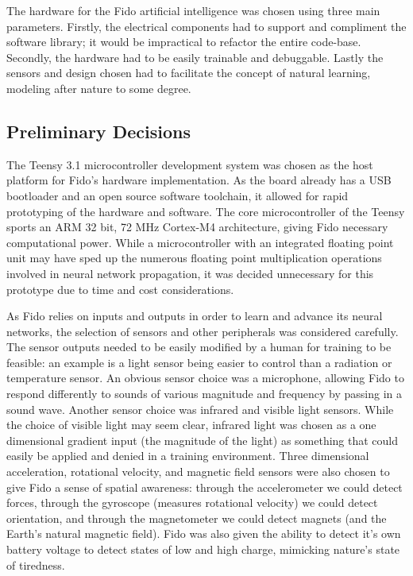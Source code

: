 The hardware for the Fido artificial intelligence was chosen using three main parameters.  Firstly, the electrical components had to support and compliment the software library; it would be impractical to refactor the entire code-base.  Secondly, the hardware had to be easily trainable and debuggable.  Lastly the sensors and design chosen had to facilitate the concept of natural learning, modeling after nature to some degree.

\subsection{Preliminary Decisions}

The Teensy 3.1 microcontroller development system was chosen as the host platform for Fido's hardware implementation.  As the board already has a USB bootloader and an open source software toolchain, it allowed for rapid prototyping of the hardware and software.  The core microcontroller of the Teensy sports an ARM 32 bit, 72 MHz Cortex-M4 architecture, giving Fido necessary computational power.  While a microcontroller with an integrated floating point unit may have sped up the numerous floating point multiplication operations involved in neural network propagation, it was decided unnecessary for this prototype due to time and cost considerations.

As Fido relies on inputs and outputs in order to learn and advance its neural networks, the selection of sensors and other peripherals was considered carefully.  The sensor outputs needed to be easily modified by a human for training to be feasible: an example is a light sensor being easier to control than a radiation or temperature sensor.  An obvious sensor choice was a microphone, allowing Fido to respond differently to sounds of various magnitude and frequency by passing in a sound wave.  Another sensor choice was infrared and visible light sensors.  While the choice of visible light may seem clear, infrared light was chosen as a one dimensional gradient input (the magnitude of the light) as something that could easily be applied and denied in a training environment.  Three dimensional acceleration, rotational velocity, and magnetic field sensors were also chosen to give Fido a sense of spatial awareness: through the accelerometer we could detect forces, through the gyroscope (measures rotational velocity) we could detect orientation, and through the magnetometer we could detect magnets (and the Earth's natural magnetic field).  Fido was also given the ability to detect it's own battery voltage to detect states of low and high charge, mimicking nature's state of tiredness.

